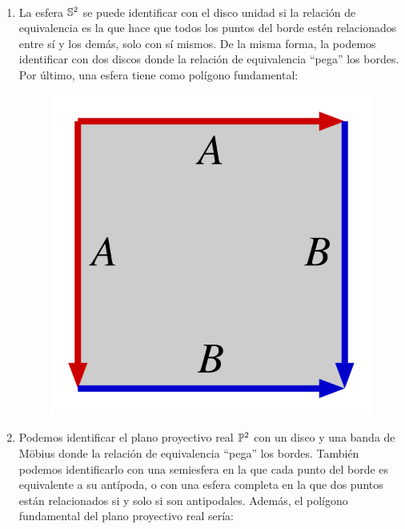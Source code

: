\begin{exa} \
	\begin{enumerate}
		\item La esfera $\mathbb{S}^2$ se puede identificar con el disco unidad si la relación de equivalencia es la que hace que todos los puntos del borde estén relacionados entre sí y los demás, solo con sí mismos. De la misma forma, la podemos identificar con dos discos donde la relación de equivalencia ``pega'' los bordes. Por último, una esfera tiene como polígono fundamental:
		
		\begin{figure}[h!]
			\centering
			\includegraphics[scale = 0.1]{img/pol_fund_esfera}
		\end{figure}
		
		\item Podemos identificar el plano proyectivo real $\mathbb{P}^2$ con un disco y una banda de Möbius donde la relación de equivalencia ``pega'' los bordes. También podemos identificarlo con una semiesfera en la que cada punto del borde es equivalente a su antípoda, o con una esfera completa en la que dos puntos están relacionados si y solo si son antipodales. Además, el polígono fundamental del plano proyectivo real sería:
		

\end{enumerate}
\end{exa}
